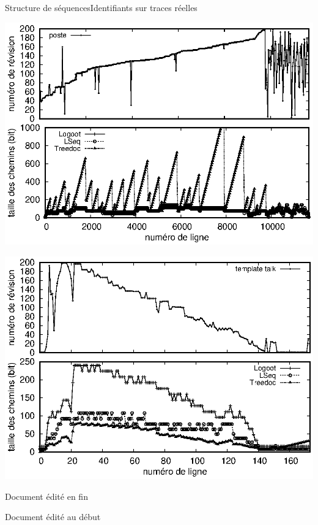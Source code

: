 \begin{frame}{Structure de séquences}{Identifiants sur traces réelles}

  \hspace{-1cm}
  \begin{minipage}{0.45\textwidth}
    \includegraphics[width=1.29\textwidth]{img/replication/poste.eps}
  \end{minipage}
  \hspace{1.2cm}
  \begin{minipage}{0.45\textwidth}
      {\includegraphics[width=1.29\textwidth]{img/replication/templatetalk.eps}}%
  \end{minipage}

  \begin{minipage}{0.4\textwidth}
    Document édité en fin
  \end{minipage}
  \hspace{1.6cm}
  \begin{minipage}{0.4\textwidth}
      {Document édité au début}%
  \end{minipage}


\end{frame}


